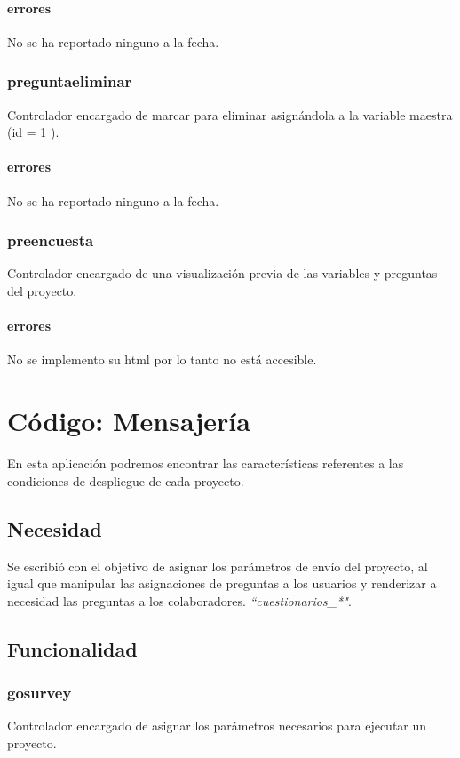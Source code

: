 \documentclass[10pt,a4paper]{book}
\begin{document}
	\subsubsection{errores}
	No se ha reportado ninguno a la fecha.
	
	\subsection{preguntaeliminar}
	Controlador encargado de marcar para eliminar asignándola a la variable maestra (id = 1 ).
	\subsubsection{errores}
	No se ha reportado ninguno a la fecha.
	
	\subsection{preencuesta}
	Controlador encargado de una visualización previa de las variables y preguntas del proyecto.
	\subsubsection{errores}
	No se implemento su html por lo tanto no está accesible.
	

	\chapter{Código: Mensajería}
	
	En esta aplicación podremos encontrar las características referentes a las condiciones de despliegue de cada proyecto.
	
	\section{Necesidad}
	
	Se escribió con el objetivo de asignar los parámetros de envío del proyecto, al igual que manipular las asignaciones de preguntas a los usuarios y renderizar a necesidad las preguntas a los colaboradores. \textit{``cuestionarios\_*"}. 
	
	\section{Funcionalidad}
		
	\subsection{gosurvey}
	Controlador encargado de asignar los parámetros necesarios para ejecutar un proyecto.
\end{document}
